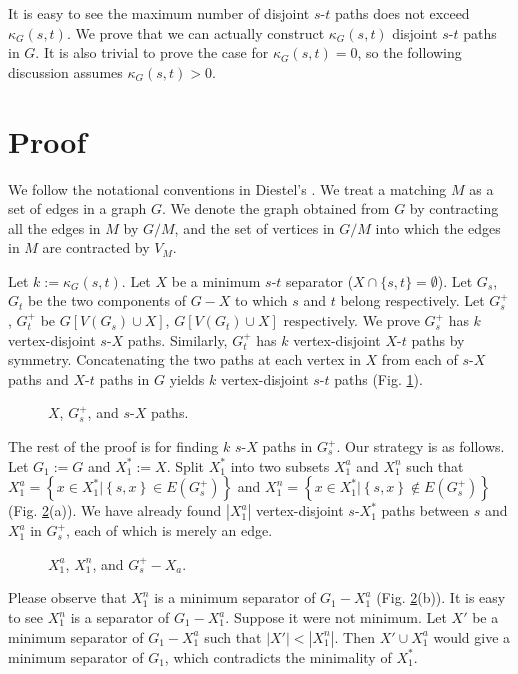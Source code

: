 \documentclass{article}
\begin{document}
It is easy to see the maximum number of disjoint $s$-$t$ paths does not exceed $\kappa_G(s, t)$.
We prove that we can actually construct $\kappa_G(s, t)$ disjoint $s$-$t$ paths in $G$.
It is also trivial to prove the case for $\kappa_G(s, t)=0$, so the following discussion assumes
$\kappa_G(s, t)>0$.

\section{Proof}
We follow the notational conventions in Diestel's \cite{diestel1}.
We treat a matching $M$ as a set of edges in a graph $G$.
We denote the graph obtained from $G$ by contracting all the edges in $M$ by $G/M$,
and the set of vertices in $G/M$ into which the edges in $M$ are contracted by $V_M$.

Let $k:=\kappa_G(s, t)$.
Let $X$ be a minimum $s$-$t$ separator ($X\cap\{s, t\}=\emptyset$).
Let $G_s$, $G_t$ be the two components of $G - X$ to which $s$ and $t$ belong respectively.
Let $G_s^+$, $G_t^+$ be $G[V(G_s)\cup X]$, $G[V(G_t)\cup X]$ respectively.
We prove $G_s^+$ has $k$ vertex-disjoint $s$-$X$ paths.
Similarly,  $G_t^+$ has $k$ vertex-disjoint $X$-$t$ paths by symmetry.
Concatenating the two paths at each vertex in $X$ from each of $s$-$X$ paths and $X$-$t$ paths in $G$
yields $k$ vertex-disjoint $s$-$t$ paths (Fig. \ref{label_fig1}).

\begin{figure}\begin{center}
\caption[Fig1]{$X$, $G_s^+$, and $s$-$X$ paths.}
\label{label_fig1}
\end{center}\end{figure}

The rest of the proof is for finding $k$ $s$-$X$ paths in $G_s^+$.
Our strategy is as follows. Let $G_1 := G$ and $X_1^* := X$.
Split $X_1^*$ into two subsets $X_1^a$ and $X_1^n$ such that
$X_1^a = \left\{ x\in X_1^* | \left\{s, x\right\}\in E(G_s^+)\right\}$ and
$X_1^n = \left\{ x\in X_1^* | \left\{s, x\right\}\not\in E(G_s^+)\right\}$ (Fig. \ref{label_fig2}(a)).
We have already found $|X_1^a|$ vertex-disjoint $s$-$X_1^*$ paths between $s$ and $X_1^a$ in $G_s^+$, each of which
is merely an edge.
\begin{figure}\begin{center}
\caption[Fig2]{$X_1^a$, $X_1^n$, and $G_s^+ - X_a$.}
\label{label_fig2}
\end{center}\end{figure}
Please observe that $X_1^n$ is a minimum separator of $G_1 - X_1^a$ (Fig. \ref{label_fig2}(b)).
It is easy to see $X_1^n$ is a separator of $G_1 - X_1^a$.
Suppose it were not minimum. Let $X'$ be a minimum separator of $G_1 - X_1^a$ such that $|X'| < |X_1^n|$.
Then $X' \cup X_1^a$ would give a minimum separator of $G_1$, which contradicts the minimality of $X_1^*$.
\end{document}
